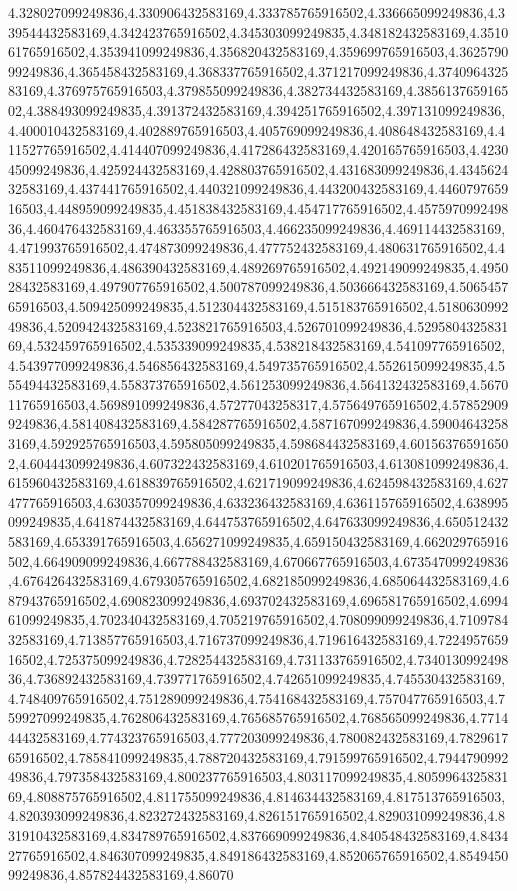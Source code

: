 4.328027099249836,4.330906432583169,4.333785765916502,4.336665099249836,4.339544432583169,4.342423765916502,4.345303099249835,4.348182432583169,4.351061765916502,4.353941099249836,4.356820432583169,4.359699765916503,4.362579099249836,4.365458432583169,4.368337765916502,4.371217099249836,4.374096432583169,4.376975765916503,4.379855099249836,4.382734432583169,4.385613765916502,4.388493099249835,4.391372432583169,4.394251765916502,4.397131099249836,4.400010432583169,4.402889765916503,4.405769099249836,4.408648432583169,4.411527765916502,4.414407099249836,4.417286432583169,4.420165765916503,4.423045099249836,4.425924432583169,4.428803765916502,4.431683099249836,4.434562432583169,4.437441765916502,4.440321099249836,4.443200432583169,4.446079765916503,4.448959099249835,4.451838432583169,4.454717765916502,4.457597099249836,4.460476432583169,4.463355765916503,4.466235099249836,4.469114432583169,4.471993765916502,4.474873099249836,4.477752432583169,4.480631765916502,4.483511099249836,4.486390432583169,4.489269765916502,4.492149099249835,4.495028432583169,4.497907765916502,4.500787099249836,4.503666432583169,4.506545765916503,4.509425099249835,4.512304432583169,4.515183765916502,4.518063099249836,4.520942432583169,4.523821765916503,4.526701099249836,4.529580432583169,4.532459765916502,4.535339099249835,4.538218432583169,4.541097765916502,4.543977099249836,4.546856432583169,4.549735765916502,4.552615099249835,4.555494432583169,4.558373765916502,4.561253099249836,4.564132432583169,4.567011765916503,4.569891099249836,4.57277043258317,4.575649765916502,4.578529099249836,4.581408432583169,4.584287765916502,4.587167099249836,4.590046432583169,4.592925765916503,4.595805099249835,4.598684432583169,4.601563765916502,4.604443099249836,4.607322432583169,4.610201765916503,4.613081099249836,4.615960432583169,4.618839765916502,4.621719099249836,4.624598432583169,4.627477765916503,4.630357099249836,4.633236432583169,4.636115765916502,4.638995099249835,4.641874432583169,4.644753765916502,4.647633099249836,4.650512432583169,4.653391765916503,4.656271099249835,4.659150432583169,4.662029765916502,4.664909099249836,4.667788432583169,4.670667765916503,4.673547099249836,4.676426432583169,4.679305765916502,4.682185099249836,4.685064432583169,4.687943765916502,4.690823099249836,4.693702432583169,4.696581765916502,4.699461099249835,4.702340432583169,4.705219765916502,4.708099099249836,4.710978432583169,4.713857765916503,4.716737099249836,4.719616432583169,4.722495765916502,4.725375099249836,4.728254432583169,4.731133765916502,4.734013099249836,4.736892432583169,4.739771765916502,4.742651099249835,4.745530432583169,4.748409765916502,4.751289099249836,4.754168432583169,4.757047765916503,4.759927099249835,4.762806432583169,4.765685765916502,4.768565099249836,4.771444432583169,4.774323765916503,4.777203099249836,4.780082432583169,4.782961765916502,4.785841099249835,4.788720432583169,4.791599765916502,4.794479099249836,4.797358432583169,4.800237765916503,4.803117099249835,4.805996432583169,4.808875765916502,4.811755099249836,4.814634432583169,4.817513765916503,4.820393099249836,4.823272432583169,4.826151765916502,4.829031099249836,4.831910432583169,4.834789765916502,4.837669099249836,4.840548432583169,4.843427765916502,4.846307099249835,4.849186432583169,4.852065765916502,4.854945099249836,4.857824432583169,4.86070